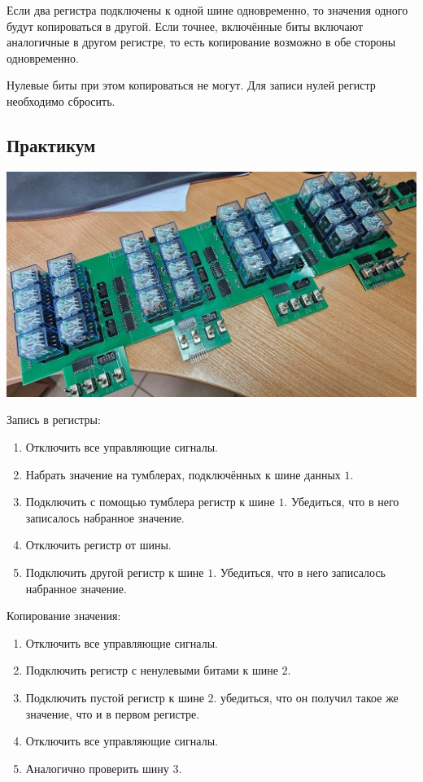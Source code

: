 Если два регистра подключены к одной шине одновременно,
то значения одного будут копироваться в другой. Если точнее,
включённые биты включают аналогичные в другом регистре, то есть
копирование возможно в обе стороны одновременно.

Нулевые биты при этом копироваться не могут. Для записи нулей
регистр необходимо сбросить.


\subsection{Практикум}


\includegraphics[width=\columnwidth]{photo/register_file.jpg}

Запись в регистры:

\begin{enumerate}
    \item Отключить все управляющие сигналы.
    \item Набрать значение на тумблерах, подключённых к шине данных $1$.
    \item Подключить с помощью тумблера регистр к шине $1$. Убедиться, что в него записалось набранное значение.
    \item Отключить регистр от шины.
    \item Подключить другой регистр к шине $1$. Убедиться, что в него записалось набранное значение.
\end{enumerate}

Копирование значения:

\begin{enumerate}
    \item Отключить все управляющие сигналы.
    \item Подключить регистр с ненулевыми битами к шине $2$.
    \item Подключить пустой регистр к шине $2$. убедиться, что он получил такое же значение, что и в первом регистре.
    \item Отключить все управляющие сигналы.
    \item Аналогично проверить шину $3$.
\end{enumerate}



